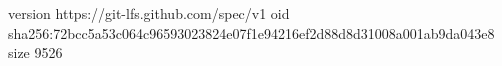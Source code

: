 version https://git-lfs.github.com/spec/v1
oid sha256:72bcc5a53c064c96593023824e07f1e94216ef2d88d8d31008a001ab9da043e8
size 9526
